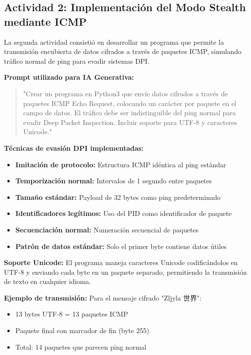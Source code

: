 \documentclass[letter,12pt]{article}
\begin{document}
\subsection{Actividad 2: Implementación del Modo Stealth mediante ICMP}

La segunda actividad consistió en desarrollar un programa que permite la transmisión encubierta de datos cifrados a través de paquetes ICMP, simulando tráfico normal de ping para evadir sistemas DPI.

\textbf{Prompt utilizado para IA Generativa:}
\begin{quote}
"Crear un programa en Python3 que envíe datos cifrados a través de paquetes ICMP Echo Request, colocando un carácter por paquete en el campo de datos. El tráfico debe ser indistinguible del ping normal para evadir Deep Packet Inspection. Incluir soporte para UTF-8 y caracteres Unicode."
\end{quote}

\textbf{Técnicas de evasión DPI implementadas:}
\begin{itemize}
    \item \textbf{Imitación de protocolo:} Estructura ICMP idéntica al ping estándar
    \item \textbf{Temporización normal:} Intervalos de 1 segundo entre paquetes
    \item \textbf{Tamaño estándar:} Payload de 32 bytes como ping predeterminado
    \item \textbf{Identificadores legítimos:} Uso del PID como identificador de paquete
    \item \textbf{Secuenciación normal:} Numeración secuencial de paquetes
    \item \textbf{Patrón de datos estándar:} Solo el primer byte contiene datos útiles
\end{itemize}

\textbf{Soporte Unicode:}
El programa maneja caracteres Unicode codificándolos en UTF-8 y enviando cada byte en un paquete separado, permitiendo la transmisión de texto en cualquier idioma.

\textbf{Ejemplo de transmisión:}
Para el mensaje cifrado "Zljyla 世界":
\begin{itemize}
    \item 13 bytes UTF-8 = 13 paquetes ICMP
    \item Paquete final con marcador de fin (byte 255)
    \item Total: 14 paquetes que parecen ping normal
\end{itemize}
\end{document}
